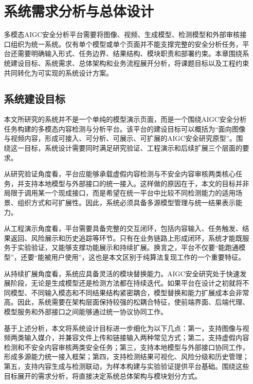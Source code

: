 
\chapter{系统需求分析与总体设计}

多模态AIGC安全分析平台需要将图像、视频、生成模型、检测模型和外部审核接口组织为统一系统。仅有单个模型或单个页面并不能支撑完整的安全分析任务，平台还需要明确输入形式、任务边界、结果结构、模块职责和部署约束。本章围绕系统建设目标、系统需求、总体架构和业务流程展开分析，将课题目标以及工程约束共同转化为可实现的系统设计方案。

\section{系统建设目标}

本文所研究的系统并不是一个单纯的模型演示页面，而是一个围绕AIGC安全分析任务构建的多模态内容检测与分析平台。该平台的建设目标可以概括为“面向图像与视频内容，形成可接入、可分析、可展示、可扩展的AIGC安全研究原型”。围绕这一目标，系统设计需要同时满足研究验证、工程演示和后续扩展三个层面的要求。

从研究验证角度看，平台应能够承载虚假内容检测与不安全内容审核两类核心任务，并支持本地模型与外部接口的统一接入。这样做的原因在于，本文的目标并非局限于调用某一个现成接口，而是希望在统一平台中比较不同检测能力的适用场景、组织方式和可扩展性。因此，系统必须具备多源模型管理与统一结果表示能力。

从工程演示角度看，平台需要具备完整的交互闭环，包括内容输入、任务触发、结果返回、风险展示和历史追踪等环节。只有在业务链路上形成闭环，系统才能既服务于实验验证，又能够支撑功能展示和持续扩展。换言之，平台不仅要“能跑通模型”，还要“能被用户使用”，这也是本文区别于纯算法复现工作的一个重要特征。

从持续扩展角度看，系统应具备灵活的模块替换能力。AIGC安全研究处于快速发展阶段，无论是生成模型还是检测方法都在持续迭代。如果平台在设计之初就将不同模型、不同输入模态和不同结果结构紧密耦合，模型替换和能力扩展成本会非常高。因此，系统需要在架构层面保持较强的松耦合特征，使前端界面、后端代理、模型服务和外部接口之间能够通过统一协议协同工作。

基于上述分析，本文将系统设计目标进一步细化为以下几点：第一，支持图像与视频两类输入媒介，并兼容文件上传和链接输入两种常见方式；第二，支持虚假内容检测和不安全内容审核两类安全任务；第三，支持本地模型与外部接口协同工作，形成多源能力统一接入框架；第四，支持检测结果可视化、风险分级和历史管理；第五，支持内容生成与检测联动，为样本构建与实验验证提供平台基础。围绕这些目标展开的需求分析，将直接决定系统总体架构与模块划分方式。


